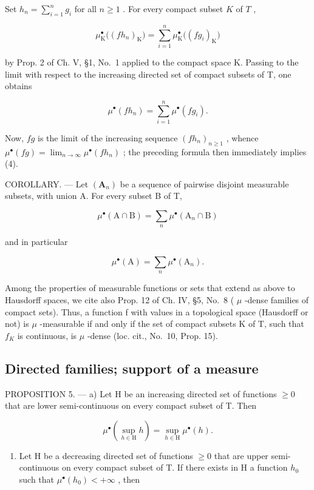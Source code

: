 Set \(h_n = \sum_{i=1}^{n} g_i\) for all \(n \geqslant 1\) . For every compact subset \(K\) of \(T\) ,

\[
\mu_ {\mathrm{K}} ^ {\bullet} \big ((f h _ {n}) _ {\mathrm{K}} \big) = \sum_ {i = 1} ^ {n} \mu_ {\mathrm{K}} ^ {\bullet} \big ((f g _ {i}) _ {\mathrm{K}} \big)
\]

by Prop. 2 of Ch. V, §1, No.~1 applied to the compact space K. Passing to the limit with respect to the increasing directed set of compact subsets of T, one obtains

\[
\mu^ {\bullet} (f h _ {n}) = \sum_ {i = 1} ^ {n} \mu^ {\bullet} (f g _ {i}).
\]

Now, \(fg\) is the limit of the increasing sequence \((fh_n)_{n\geqslant 1}\) , whence \(\mu^{\bullet}(fg) = \lim_{n\to \infty}\mu^{\bullet}(fh_n)\) ; the preceding formula then immediately implies (4).

COROLLARY. --- Let \((\mathbf{A}_{n})\) be a sequence of pairwise disjoint measurable subsets, with union A. For every subset B of T,

\[
\mu^ {\bullet} (\mathrm{A} \cap \mathrm{B}) = \sum_ {n} \mu^ {\bullet} (\mathrm{A} _ {n} \cap \mathrm{B})
\]

and in particular

\[
\mu^ {\bullet} (\mathrm{A}) = \sum_ {n} \mu^ {\bullet} (\mathrm{A} _ {n}).
\]

Among the properties of measurable functions or sets that extend as above to Hausdorff spaces, we cite also Prop. 12 of Ch. IV, §5, No.~8 ( \(\mu\) -dense families of compact sets). Thus, a function f with values in a topological space (Hausdorff or not) is \(\mu\) -measurable if and only if the set of compact subsets K of T, such that \(f_{K}\) is continuous, is \(\mu\) -dense (loc. cit., No.~10, Prop. 15).

\subsection{Directed families; support of a measure}

PROPOSITION 5. --- a) Let H be an increasing directed set of functions \(\geqslant 0\) that are lower semi-continuous on every compact subset of T. Then

\[
\mu^ {\bullet} \left(\sup _ {h \in \mathrm{H}} h\right) = \sup _ {h \in \mathrm{H}} \mu^ {\bullet} (h).\tag{5}
\]

\begin{enumerate}
\def\labelenumi{\alph{enumi})}
\setcounter{enumi}{1}
\tightlist
\item
  Let H be a decreasing directed set of functions \(\geqslant0\) that are upper semi-continuous on every compact subset of T. If there exists in H a function \(h_{0}\) such that \(\mu^{\bullet}(h_{0})<+\infty\) , then
\end{enumerate}

